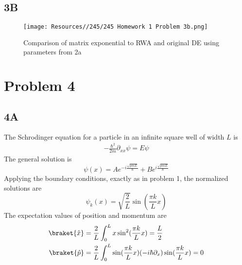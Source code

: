 \subsection*{3B}
\begin{figure}[h]
    \centering
    \texttt{[image: Resources//245/245 Homework 1 Problem 3b.png]}
    \caption{Comparison of matrix exponential to RWA and original DE using parameters from 2a}
    \label{fig:enter-label}
\end{figure}

\section*{Problem 4}

\subsection*{4A}
The Schrodinger equation for a particle in an infinite square well of width $L$ is
\begin{equation}
    \begin{split}
        -\frac{\hbar^2}{2m}\partial_{xx}\psi = E\psi
    \end{split}
\end{equation}
The general solution is
\begin{equation}
    \psi(x)=Ae^{-i\frac{\sqrt{pmE}}{\hbar}}+Be^{i\frac{\sqrt{pmE}}{\hbar}}
\end{equation}
Applying the boundary conditions, exactly as in problem 1, the normalized solutions are
\begin{equation}
    \psi_k(x)=\sqrt{\frac{2}{L}}\sin(\frac{\pi k}{L}x)
\end{equation}
The expectation values of position and momentum are
\begin{equation}
    \begin{split}
        \braket{\hat{x}} &= \frac{2}{L}\int_0^Lx\sin^2(\frac{\pi k}{L}x)=\frac{L}{2}\\
        \braket{\hat{p}} &= \frac{2}{L}\int_0^L\sin(\frac{\pi k}{L}x)(-i\hbar\partial_x)\sin(\frac{\pi k}{L}x) = 0
    \end{split}
\end{equation}

